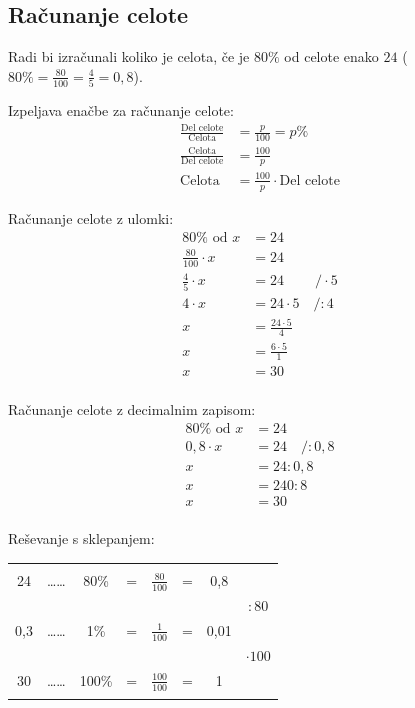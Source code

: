 \documentclass{article}
\begin{document}
\pagebreak
\subsection{ Računanje celote }
Radi bi izračunali koliko je celota, če je $80\%$ od celote enako $24$ ($80\%=\frac{80}{100}=\frac{4}{5}=0,8$).

Izpeljava enačbe za računanje celote:
\begin{align*}
    \frac{\text{Del celote}}{\text{Celota}} &= \frac{p}{100} = p\% \\
    \frac{\text{Celota}}{\text{Del celote}} &= \frac{100}{p} \\
    \text{Celota} &= \frac{100}{p} \cdot \text{Del celote}
\end{align*}

Računanje celote z ulomki:
\begin{align*}
    80\% \text{ od } x &= 24 \\
    \frac{80}{100} \cdot x &= 24 \\
    \frac{4}{5} \cdot x &= 24 \quad\quad\ /\cdot5\\
    4 \cdot x &= 24 \cdot 5 \quad /:4\\
    x &= \frac{24 \cdot 5}{4} \\
    x &= \frac{6 \cdot 5}{1} \\
    x &= 30 \\
\end{align*}

Računanje celote z decimalnim zapisom:
\begin{align*}
    80\% \text{ od } x &= 24 \\
    0,8 \cdot x &= 24 \quad /:0,8\\
    x &= 24 : 0,8\\
    x &= 240 : 8\\
    x &= 30 \\
\end{align*}

\pagebreak
Reševanje s sklepanjem:
\begin{center}
    \begin{tabular}{ c c c c c c c c }
        &&&&&&&  \\
        24 & \dots\dots & 80\% & = & $\frac{80}{100}$ & = & 0,8\\ 
        &&&&&&&  $:80$ \\
        0,3 & \dots\dots & 1\% & = & $\frac{1}{100}$ & = & 0,01\\ 
        &&&&&&&  $\cdot 100$\\
        30 & \dots\dots & 100\% & = & $\frac{100}{100}$ & = & 1\\ 
        &&&&&&&  \\
    \end{tabular}
\end{center}
\end{document}
